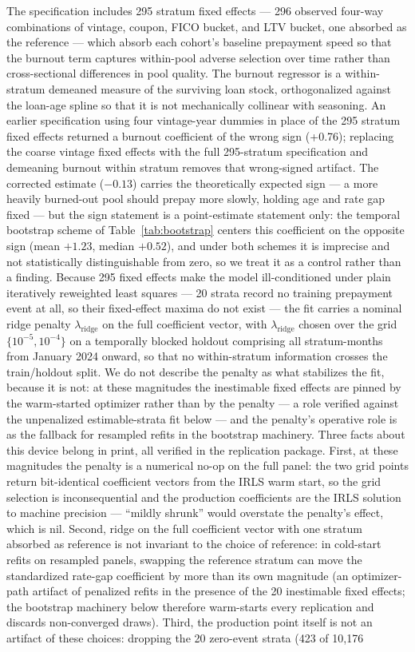 \documentclass[12pt]{article}
\begin{document}
The specification includes 295 stratum fixed effects --- 296 observed four-way combinations of vintage, coupon, FICO bucket, and LTV bucket, one absorbed as the reference --- which absorb each cohort's baseline prepayment speed so that the burnout term captures within-pool adverse selection over time rather than cross-sectional differences in pool quality. The burnout regressor is a within-stratum demeaned measure of the surviving loan stock, orthogonalized against the loan-age spline so that it is not mechanically collinear with seasoning. An earlier specification using four vintage-year dummies in place of the 295 stratum fixed effects returned a burnout coefficient of the wrong sign (+0.76); replacing the coarse vintage fixed effects with the full 295-stratum specification and demeaning burnout within stratum removes that wrong-signed artifact. The corrected estimate ($-0.13$) carries the theoretically expected sign --- a more heavily burned-out pool should prepay more slowly, holding age and rate gap fixed --- but the sign statement is a point-estimate statement only: the temporal bootstrap scheme of Table~\ref{tab:bootstrap} centers this coefficient on the opposite sign (mean $+1.23$, median $+0.52$), and under both schemes it is imprecise and not statistically distinguishable from zero, so we treat it as a control rather than a finding. Because 295 fixed effects make the model ill-conditioned under plain iteratively reweighted least squares --- 20 strata record no training prepayment event at all, so their fixed-effect maxima do not exist --- the fit carries a nominal ridge penalty $\lambda_{\mathrm{ridge}}$ on the full coefficient vector, with $\lambda_{\mathrm{ridge}}$ chosen over the grid $\{10^{-5}, 10^{-4}\}$ on a temporally blocked holdout comprising all stratum-months from January 2024 onward, so that no within-stratum information crosses the train/holdout split. We do not describe the penalty as what stabilizes the fit, because it is not: at these magnitudes the inestimable fixed effects are pinned by the warm-started optimizer rather than by the penalty --- a role verified against the unpenalized estimable-strata fit below --- and the penalty's operative role is as the fallback for resampled refits in the bootstrap machinery. Three facts about this device belong in print, all verified in the replication package. First, at these magnitudes the penalty is a numerical no-op on the full panel: the two grid points return bit-identical coefficient vectors from the IRLS warm start, so the grid selection is inconsequential and the production coefficients are the IRLS solution to machine precision --- ``mildly shrunk'' would overstate the penalty's effect, which is nil. Second, ridge on the full coefficient vector with one stratum absorbed as reference is not invariant to the choice of reference: in cold-start refits on resampled panels, swapping the reference stratum can move the standardized rate-gap coefficient by more than its own magnitude (an optimizer-path artifact of penalized refits in the presence of the 20 inestimable fixed effects; the bootstrap machinery below therefore warm-starts every replication and discards non-converged draws). Third, the production point itself is not an artifact of these choices: dropping the 20 zero-event strata (423 of 10,176 
\end{document}
